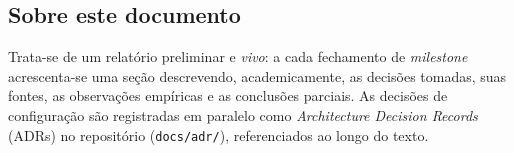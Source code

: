 \subsection{Sobre este documento}
Trata-se de um relatório preliminar e \emph{vivo}: a cada fechamento de \emph{milestone}
acrescenta-se uma seção descrevendo, academicamente, as decisões tomadas, suas fontes,
as observações empíricas e as conclusões parciais. As decisões de configuração são
registradas em paralelo como \emph{Architecture Decision Records} (ADRs) no
repositório (\texttt{docs/adr/}), referenciados ao longo do texto.
